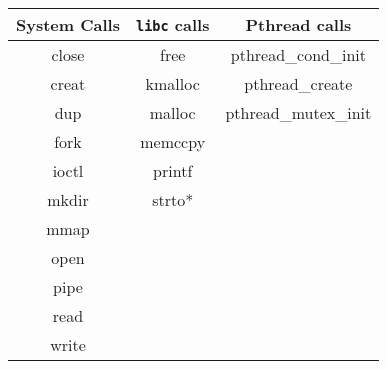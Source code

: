 \documentclass[10pt]{article}
\newenvironment{allintypewriter}{\ttfamily}{\par}
\begin{document}
\begin{center}
	\begin{allintypewriter}
	\begin{tabular}{|c |c | c|}
	\hline
	System Calls & \texttt{libc} calls & Pthread calls \\ \hline \hline
	close & free& pthread\_cond\_init\\ 
	creat & kmalloc& pthread\_create\\
	dup & malloc&pthread\_mutex\_init\\
	fork & memccpy&\\
	ioctl & printf&\\
	mkdir & strto*&\\
	mmap & &\\
 	open & &\\
	pipe & &\\
	read & &\\
	write & &\\ \hline
	\end{tabular}
	\end{allintypewriter}
\end{center}
\end{document}
